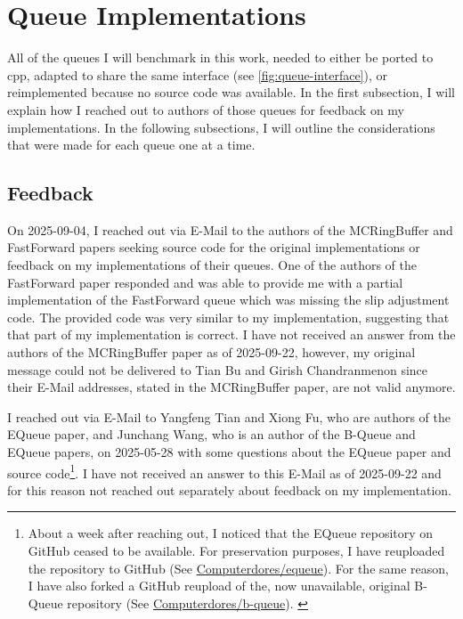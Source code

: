 \section{Queue Implementations}
All of the queues I will benchmark in this work, needed to either be ported to cpp, adapted to share the same
interface (see \autoref{fig:queue-interface}), or reimplemented because no source code was available.
In the first subsection, I will explain how I reached out to authors of those queues for feedback on my implementations.
In the following subsections, I will outline the considerations that were made for each queue one at a time.

\subsection{Feedback}
On 2025-09-04, I reached out via E-Mail to the authors of the MCRingBuffer and FastForward papers seeking
source code for the original implementations or feedback on my implementations of their queues.
One of the authors of the FastForward paper responded and was able to provide me with a partial
implementation of the FastForward queue which was missing the slip adjustment code.
The provided code was very similar to my implementation, suggesting that that part of my implementation is correct.
I have not received an answer from the authors of the MCRingBuffer paper as of 2025-09-22, however, my
original message could not be delivered to Tian Bu and Girish Chandranmenon since their E-Mail addresses,
stated in the MCRingBuffer paper, are not valid anymore.

I reached out via E-Mail to Yangfeng Tian and Xiong Fu, who are authors of the EQueue paper, and Junchang
Wang, who is an author of the B-Queue and EQueue papers, on 2025-05-28 with some questions about the EQueue
paper and source code\footnote{About a week after reaching out,
    I noticed that the EQueue repository on GitHub ceased to be available.
    For preservation purposes, I have reuploaded the repository to GitHub (See
    \href{https://github.com/Computerdores/equeue}{Computerdores/equeue}).
    For the same reason, I have also forked a GitHub reupload of the, now unavailable, original B-Queue
    repository (See \href{https://github.com/Computerdores/b-queue}{Computerdores/b-queue}).
\label{equeue-bqueue-links}}.
I have not received an answer to this E-Mail as of 2025-09-22 and for this reason not reached out separately
about feedback on my implementation.

